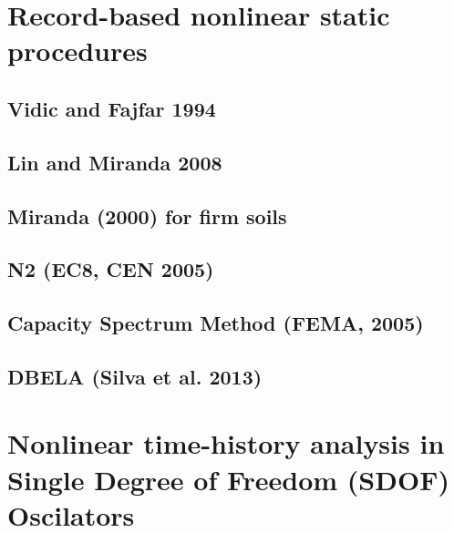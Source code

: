 	\section{Record-based nonlinear static procedures}
	\label{sec:record-nsp}
	

		\subsection{Vidic and Fajfar 1994}
		\label{subsec:VidicEtAl1994}
		

		\subsection{Lin and Miranda 2008}
		\label{subsec:LinMiranda2008}
		

		\subsection{Miranda (2000) for firm soils}
		\label{subsec:Miranda}
		

		\subsection{N2 (EC8, CEN 2005)}
		\label{subsec:N2}
		

		\subsection{Capacity Spectrum Method (FEMA, 2005)}
		\label{subsec:CSM}
		

		\subsection{DBELA (Silva et al. 2013)}
		\label{subsec:DBELA_Silva2013}
		

	\section{Nonlinear time-history analysis in Single Degree of Freedom (SDOF) Oscilators}
	\label{subsec:NLTHA_SDOF}
	

